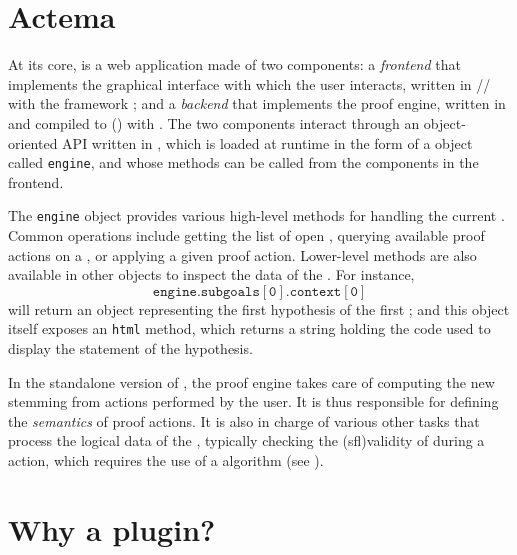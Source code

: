 \section{Actema}

\AP
At its core,  is a web application made of two components: a
\emph{frontend} that implements the graphical interface with which the user
interacts, written in // with the 
framework \cite{Vuejs}; and a \emph{backend} that implements the proof engine,
written in  and compiled to  () with
 . The two components
interact through an object-oriented API written in , which is loaded
at runtime in the form of a  object called \texttt{engine}, and whose
methods can be called from the  components in the frontend.

The \texttt{engine} object provides various high-level methods for handling the
current \emph{}. Common operations include getting the list of open
, querying available proof actions on a , or applying a given
proof action. Lower-level methods are also available in other objects to inspect
the data of the . For instance,
$$\mathtt{engine.subgoals[0].context[0]}$$ will return an object representing
the first hypothesis of the first ; and this object itself exposes
an \texttt{html} method, which returns a string holding the  code used to
display the statement of the hypothesis.

In the standalone version of , the proof engine takes care of
computing the new  stemming from actions performed by the user. It
is thus responsible for defining the \emph{semantics} of proof actions. It is
also in charge of various other tasks that process the logical data of the
, typically checking the \kl(sfl){validity} of 
during a  action, which requires the use of a  algorithm
(see ).

\section{Why a plugin?}

